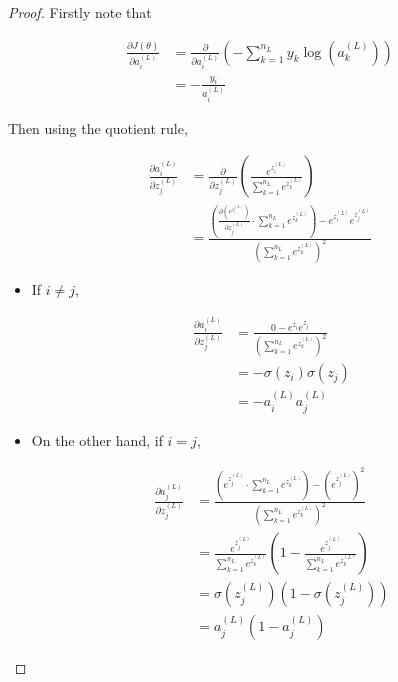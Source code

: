 \documentclass{article}[11pt]
\begin{document}
        
        \begin{proof}
            
            Firstly note that
            
            $$ \begin{aligned}
            \frac{\partial J(\theta)}{\partial a^{(L)}_i}
            &= \frac{\partial}{\partial a^{(L)}_i} \left( - \sum_{k=1}^{n_L} y_k \log(a^{(L)}_k) \right) \\
            &= - \frac{y_i}{a^{(L)}_i}
            \end{aligned} $$
            
            
            Then using the quotient rule,
            
            $$ \begin{aligned}
            \frac{\partial a^{(L)}_i}{\partial z^{(L)}_j}
            &= \frac{\partial}{\partial z^{(L)}_j} \left( \frac{e^{z^{(L)}_i}}{\sum_{k=1}^{n_L} e^{z^{(L)}_k}} \right) \\
            &= \frac{\left( \frac{\partial \left( e^{z^{(L)}_i}\right)}{\partial z^{(L)}_j} \cdot \sum_{k=1}^{n_L} e^{z^{(L)}_k} \right) - e^{z^{(L)}_i} e^{z^{(L)}_j}}{\left( \sum_{k=1}^{n_L} e^{z^{(L)}_k} \right)^2}
            \end{aligned} $$
            
            \begin{itemize}
            
                \item If $i \neq j$,
            
                $$ \begin{aligned}
                \frac{\partial a^{(L)}_i}{\partial z^{(L)}_j}
                &= \frac{0 - e^{z_i} e^{z_j}}{\left( \sum_{k=1}^{n_L} e^{z^{(L)}_k} \right)^2} \\
                &= - \sigma(z_i) \sigma(z_j) \\
                &= - a^{(L)}_i a^{(L)}_j
                \end{aligned} $$
            
                \item On the other hand, if $i = j$,
            
                $$ \begin{aligned}
                \frac{\partial a^{(L)}_j}{\partial z^{(L)}_j}
                &= \frac{\left( e^{z^{(L)}_j} \cdot \sum_{k=1}^{n_L} e^{z^{(L)}_k} \right) - \left( e^{z^{(L)}_j} \right)^2}{\left( \sum_{k=1}^{n_L} e^{z^{(L)}_k} \right)^2} \\
                &= \frac{e^{z^{(L)}_j}}{\sum_{k=1}^{n_L} e^{z^{(L)}_k}} \left( 1 - \frac{e^{z^{(L)}_j}}{\sum_{k=1}^{n_L} e^{z^{(L)}_k}} \right) \\
                &= \sigma(z^{(L)}_j) \left( 1 - \sigma(z^{(L)}_j) \right) \\
                &= a^{(L)}_j \left( 1 - a^{(L)}_j \right)
                \end{aligned} $$
            

\end{itemize}
\end{proof}
\end{document}
